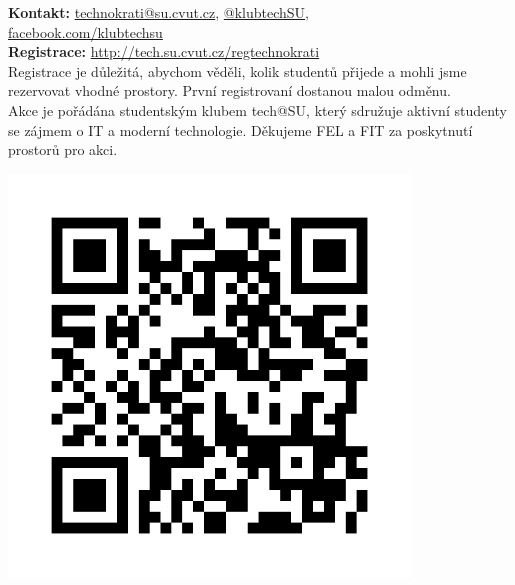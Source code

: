 \documentclass[12pt]{extarticle}[10.3.2013]
\makeatletter
\newcommand{\B}[1]{\textbf{{#1}}}
\newcommand{\techSU}{tech@SU}
\makeatother
\begin{document}
\begin{minipage}[c]{0.5\textwidth}
\B{Kontakt:} \href{mailto:technokrati@su.cvut.cz}{technokrati@su.cvut.cz}, \href{https://twitter.com/klubtechsu}{@klubtechSU}, \\ \href{https://facebook.com/klubtechsu}{facebook.com/klubtechsu} \\

\B{Registrace:} \href{http://tech.su.cvut.cz/regtechnokrati}{http://tech.su.cvut.cz/regtechnokrati} \\
Registrace je důležitá, abychom věděli, kolik studentů přijede a mohli jsme rezervovat vhodné prostory. První registrovaní dostanou malou odměnu. \\

Akce je pořádána studentským klubem \techSU, který sdružuje aktivní studenty se zájmem o IT a moderní technologie. Děkujeme FEL a FIT za poskytnutí prostorů pro akci.
\end{minipage}
\begin{minipage}[c]{0.5\textwidth}
\begin{center}
	{\includegraphics[width=0.8\textwidth]{reg-odkaz.png}}
\end{center}
\end{minipage}
\end{document}
